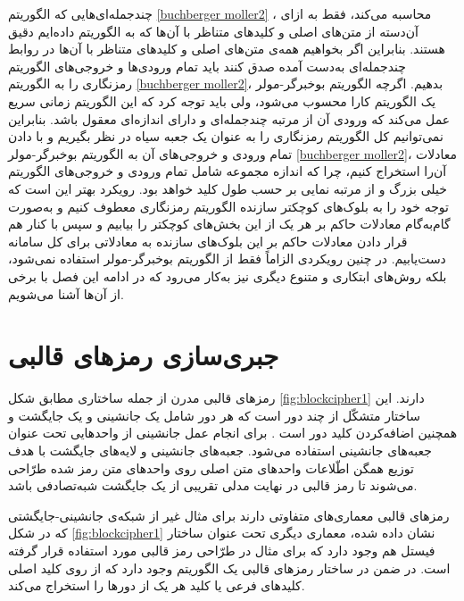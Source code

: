 چندجمله‌ای‌هایی که الگوریتم 
\ref{buchberger moller2}
، محاسبه می‌کند، فقط به ازای آن‌دسته از متن‌های اصلی و کلید‌های متناظر با آن‌ها که به الگوریتم داده‌ایم دقیق هستند. بنابراین اگر بخواهیم همه‌ی متن‌های اصلی و کلید‌های متناظر با آن‌ها در روابط چندجمله‌ای به‌دست آمده صدق کنند باید تمام ورودی‌ها و خروجی‌های الگوریتم رمزنگاری را به الگوریتم 
\ref{buchberger moller2}،
بدهیم. اگر‌چه الگوریتم بوخبرگر-مولر یک الگوریتم کارا محسوب می‌شود، ولی باید توجه کرد که این الگوریتم زمانی سریع عمل می‌کند که ورودی آن از مرتبه چندجمله‌ای و دارای اندازه‌ای معقول باشد. بنابراین نمی‌توانیم کل الگوریتم رمزنگاری را به عنوان یک جعبه سیاه در نظر بگیریم و با دادن تمام ورودی و خروجی‌های آن به الگوریتم بوخبرگر-مولر 
\ref{buchberger moller2}، 
معادلات آن‌را استخراج کنیم، چرا که اندازه مجموعه شامل تمام ورودی و خروجی‌های الگوریتم خیلی بزرگ و از مرتبه نمایی بر حسب طول کلید خواهد بود.  رویکرد بهتر این است که توجه خود را به بلوک‌های کوچکتر سازنده الگوریتم رمزنگاری معطوف کنیم و به‌صورت گام‌به‌گام معادلات حاکم بر هر یک از این بخش‌های کوچکتر را بیابیم و سپس با کنار هم قرار دادن معادلات حاکم بر این 
بلوک‌های سازنده به معادلاتی برای کل سامانه دست‌یابیم. در چنین رویکردی الزاماً فقط از الگوریتم بوخبرگر-مولر استفاده نمی‌شود، بلکه  روش‌های ابتکاری و متنوع دیگری نیز به‌کار می‌رود که در ادامه این فصل با برخی از آن‌ها آشنا می‌شویم. 
\section{جبری‌سازی رمزهای قالبی}
رمزهای قالبی
مدرن از جمله 
ساختاری مطابق شکل 
\ref{fig:blockcipher1}
دارند. این ساختار متشکّل از چند دور است که هر دور شامل یک جانشینی 
و یک جایگشت
 و همچنین اضافه‌کردن کلید دور است .  برای انجام عمل جانشینی از واحدهایی تحت عنوان جعبه‌های جانشینی
استفاده می‌شود. جعبه‌های جانشینی  و لایه‌های جایگشت با هدف توزیع همگن اطّلاعات واحد‌های متن اصلی روی واحد‌های متن رمز شده طرّاحی می‌شوند تا رمز قالبی در نهایت مدلی تقریبی از یک جایگشت شبه‌تصادفی باشد.

 رمز‌های قالبی معماری‌های متفاوتی دارند برای مثال غیر از شبکه‌ی جانشینی-جایگشتی که در شکل
\ref{fig:blockcipher1}
نشان داده شده، معماری دیگری تحت عنوان ساختار فیستل 
هم وجود دارد که برای مثال  در طرّاحی رمز قالبی 
مورد استفاده قرار گرفته است.
در ضمن در  ساختار رمزهای  قالبی یک الگوریتم وجود دارد که از روی کلید اصلی کلید‌های فرعی یا کلید‌ هر یک از  دورها را استخراج می‌کند.

